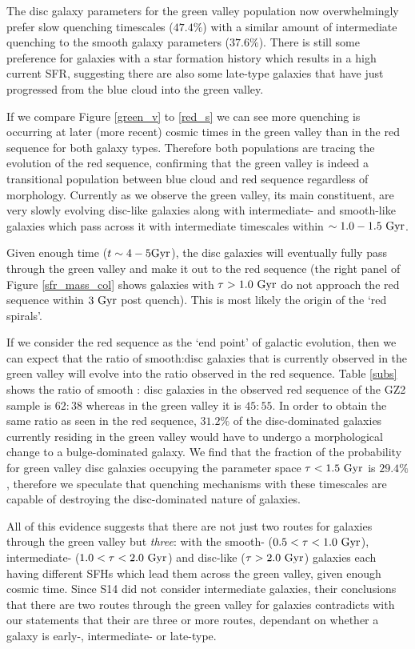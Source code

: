 \documentclass[useAMS,usenatbib]{mn2e}
\def\changed    {\color{titlecol} }
\begin{document}
{\changed The disc galaxy parameters for the green valley population now overwhelmingly prefer slow quenching timescales ($47.4\%$) with a similar amount of intermediate quenching to the smooth galaxy parameters ($37.6\%$).} There is still some preference for galaxies with a star formation history which results in a high current SFR, suggesting there are also some late-type galaxies that have just progressed from the blue cloud into the green valley. 

{\changed If we compare Figure \ref{green_v} to \ref{red_s} we can see more quenching is occurring at later (more recent) cosmic times in the green valley than in the red sequence for both galaxy types.} Therefore both populations are tracing the evolution of the red sequence, confirming that the green valley is indeed a transitional population between blue cloud and red sequence regardless of morphology. Currently as we observe the green valley, its main constituent, are very slowly evolving disc-like galaxies along with intermediate- and smooth-like galaxies which pass across it with intermediate timescales within $\sim 1.0-1.5~\rm{Gyr}$.

Given enough time ($t\sim4-5\rm{Gyr}$), the disc galaxies will eventually fully pass through the green valley and make it out to the red sequence (the right panel of Figure \ref{sfr_mass_col} shows galaxies with $\tau > 1.0~\rm{Gyr}$ do not approach the red sequence within $3~\rm{Gyr}$ post quench). This is most likely the origin of the `red spirals'.

{\changed If we consider the red sequence as the `end point' of galactic evolution, then we can expect that the ratio of smooth:disc galaxies that is currently observed in the green valley will evolve into the ratio observed in the red sequence. Table \ref{subs} shows the ratio of smooth : disc galaxies in the observed red sequence of the GZ2 sample is $62:38$ whereas in the green valley it is $45:55$. In order to obtain the same ratio as seen in the red sequence, $31.2\%$ of the disc-dominated galaxies currently residing in the green valley would have to undergo a morphological change to a bulge-dominated galaxy. We find that the fraction of the probability for green valley disc galaxies occupying the parameter space $\tau < 1.5 ~\rm{Gyr}$ is $29.4\%$, therefore we speculate that quenching mechanisms with these timescales are capable of destroying the disc-dominated nature of galaxies.}

All of this evidence suggests that there are not just two routes for galaxies through the green valley but \emph{three}: with the smooth- ($0.5 < \tau < 1.0 ~\rm{Gyr}$), intermediate- ($1.0 < \tau < 2.0~\rm{Gyr}$) and disc-like ($\tau > 2.0~\rm{Gyr}$) galaxies each having different SFHs which lead them across the green valley, given enough cosmic time. Since S14 did not consider intermediate galaxies, their conclusions that there are two routes through the green valley for galaxies contradicts with our statements that their are three or more routes, dependant on whether a galaxy is early-, intermediate- or late-type. 
\end{document}
